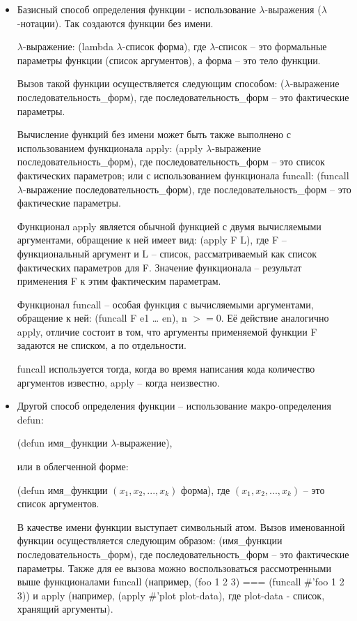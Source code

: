 \documentclass{article}
\begin{document}
\begin{itemize}
	\item Базисный способ  определения  функции - использование $\lambda$-выражения ($\lambda$-нотации). Так создаются функции без имени.
	
	$\lambda$-выражение: (lambda $\lambda$-список форма), 
	где $\lambda$-список --  это формальные параметры функции (список аргументов), а форма -- это тело функции.
	
	Вызов такой функции осуществляется следующим способом: ($\lambda$-выражение последовательность\_форм), 
	где последовательность\_форм -- это фактические параметры.
	
	Вычисление функций без имени может быть также выполнено с использованием функционала apply: (apply $\lambda$-выражение последовательность\_форм), где последовательность\_форм -- это список фактических параметров; или с использованием функционала funcall: (funcall $\lambda$-выражение последовательность\_форм), где последовательность\_форм -- это фактические параметры.
	
	Функционал apply является обычной функцией с двумя  вычисляемыми аргументами, обращение к ней имеет вид: (apply F L), где F – функциональный аргумент и L -- список, рассматриваемый как список фактических параметров для F. Значение функционала -- результат применения F к этим фактическим параметрам.
	
	Функционал funcall – особая функция с вычисляемыми аргументами, обращение к ней: (funcall F e1 … en), n $>= 0$. Её   действие аналогично apply, отличие состоит в том, что аргументы  применяемой функции F задаются не списком, а по отдельности. 
	
	funcall используется тогда, когда во время написания кода количество аргументов известно, apply -- когда неизвестно.
	
	\item Другой способ определения функции -- использование макро-определения defun: 
	
	(defun имя\_функции $\lambda$-выражение), 
	
	или  в облегченной форме:
	
	(defun имя\_функции $(x_1, x_2, ..., x_k)$ форма), 
	где $(x_1, x_2, ..., x_k)$ -- это  список аргументов.
	
	В качестве имени функции выступает символьный атом. 
	Вызов именованной функции осуществляется следующим образом: (имя\_функции последовательность\_форм), 
	где последовательность\_форм -- это фактические параметры.
	Также для ее вызова можно воспользоваться рассмотренными выше функционалами funcall (например, (foo 1 2 3) === (funcall \#'foo 1 2 3)) и apply (например, (apply \#'plot plot-data), где plot-data - список, хранящий аргументы).
	
\end{itemize}
\end{document}
